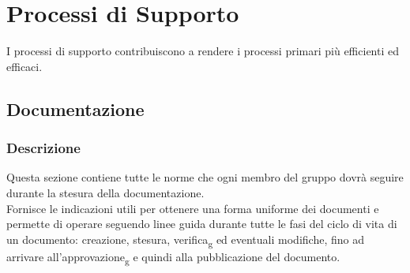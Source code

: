 \section{Processi di Supporto}
I processi di supporto contribuiscono a rendere i processi primari più
efficienti ed efficaci.
\subsection{Documentazione}
\subsubsection{Descrizione}
Questa sezione contiene tutte le norme che ogni membro del gruppo dovrà seguire
durante la stesura della documentazione.\\ Fornisce le indicazioni utili per
ottenere una forma uniforme dei documenti e permette di operare seguendo linee
guida durante tutte le fasi del ciclo di vita di un documento: creazione,
stesura, verifica\textsubscript{g} ed eventuali modifiche, fino ad arrivare
all'approvazione\textsubscript{g} e quindi alla pubblicazione del documento.
